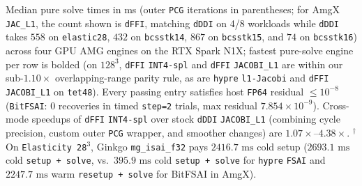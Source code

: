 \documentclass[10pt]{article}
\begin{document}
\begin{table}[t]
\caption{Median pure solve times in ms (outer \texttt{PCG} iterations in parentheses; for AmgX \texttt{JAC\_L1}, the count shown is \texttt{dFFI}, matching \texttt{dDDI} on 4/8 workloads while \texttt{dDDI} takes $558$ on \texttt{elastic28}, $432$ on \texttt{bcsstk14}, $867$ on \texttt{bcsstk15}, and $74$ on \texttt{bcsstk16}) across four GPU AMG engines on the RTX Spark N1X; fastest pure-solve engine per row is bolded (on $128^3$, \texttt{dFFI} \texttt{INT4-spl} and \texttt{dFFI} \texttt{JACOBI\_L1} are within our sub-$1.10\times$ overlapping-range parity rule, as are \texttt{hypre} \texttt{l1-Jacobi} and \texttt{dFFI} \texttt{JACOBI\_L1} on \texttt{tet48}). Every passing entry satisfies host \texttt{FP64} residual $\le 10^{-8}$ (\texttt{BitFSAI}: 0 recoveries in timed \texttt{step=2} trials, max residual $7.854\times 10^{-9}$). Cross-mode speedups of \texttt{dFFI} \texttt{INT4-spl} over stock \texttt{dDDI} \texttt{JACOBI\_L1} (combining cycle precision, custom outer \texttt{PCG} wrapper, and smoother changes) are $1.07\times$--$4.38\times$. $^\dagger$On \texttt{Elasticity 28$^3$}, Ginkgo \texttt{mg\_isai\_f32} pays $2416.7\text{ ms}$ cold setup ($2693.1\text{ ms}$ cold \texttt{setup + solve}, vs.\ $395.9\text{ ms}$ cold \texttt{setup + solve} for \texttt{hypre} \texttt{FSAI} and $2247.7\text{ ms}$ warm \texttt{resetup + solve} for BitFSAI in AmgX).}
\label{tab:four_engine}
\end{table}
\end{document}
